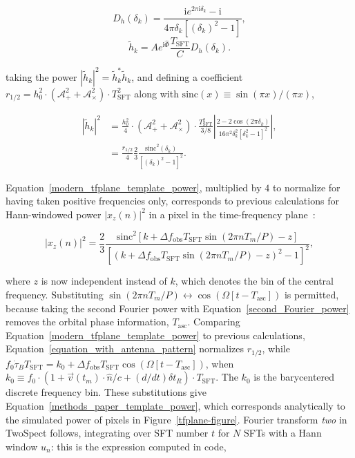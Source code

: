 \documentclass[12pt]{iopart}
\begin{document}
\begin{equation}
D_h (\delta_k) = \frac{\mathrm{i} e^{2\pi \mathrm{i} \delta_k} - \mathrm{i}}{4\pi \delta_k \left[(\delta_k)^2 - 1 \right]},
\end{equation} 
\begin{equation}
\tilde{h}_k = A e^{\mathrm{i} \hat{\Phi}} \frac{T_\mathrm{SFT}}{C} D_h \left( \delta_k \right).
\end{equation}

\noindent taking the power $|\tilde{h}_k|^2 = \tilde{h}_k^*\tilde{h}_k$, and defining a coefficient $r_{1/2}= h_0^2 \cdot (\mathcal{A}_+^2 + \mathcal{A}_\times^2)\cdot T_\mathrm{SFT}^2$ along with $\mathrm{sinc}(x) \equiv \sin (\pi x)/ (\pi x)$,

\begin{eqnarray}
|\tilde{h}_k|^2 &= \frac{h_0^2}{4} \cdot (\mathcal{A}_+^2 + \mathcal{A}_\times^2)\cdot\frac{T_\mathrm{SFT}^2}{3/8} \left|\frac{2 - 2 \cos(2\pi \delta_k)}{16 \pi^2 \delta_k^2 [\delta_k^2 -1]^2} \right|,\nonumber \\
 &= \frac{r_{1/2}}{4} \frac{2}{3} \frac{\mathrm{sinc}^2\left(\delta_k\right)}{[\left(\delta_k \right)^2-1]^2}.
\label{modern_tfplane_template_power}
\end{eqnarray} 

Equation~\ref{modern_tfplane_template_power}, multiplied by $4$ to normalize for having taken positive frequencies only, corresponds to previous calculations for Hann-windowed power $|x_z(n)|^2$ in a pixel in the time-frequency plane~\cite{GoetzTwoSpectMethods2011}:

\begin{equation}
|x_z (n)|^2 = \frac{2}{3} \frac{\mathrm{sinc}^2\left[k + \Delta f_\mathrm{obs} T_\mathrm{SFT} \sin (2\pi n T_m/P) - z \right]}{\left[ (k + \Delta f_\mathrm{obs} T_\mathrm{SFT} \sin (2\pi n T_m / P) - z)^2 - 1 \right]^2},
\label{methods_paper_template_power}
\end{equation}

\noindent where $z$ is now independent instead of $k$, which denotes the bin of the central frequency. 
Substituting $\sin(2\pi nT_m/P) \leftrightarrow \cos(\Omega [t-T_\mathrm{asc}])$ is permitted, because taking the second Fourier power with Equation~\ref{second_Fourier_power} removes the orbital phase information, $T_\mathrm{asc}$.
Comparing Equation~\ref{modern_tfplane_template_power} to previous calculations, Equation~\ref{equation_with_antenna_pattern} normalizes $r_{1/2}$, while $f_0 \dot{\tau}_B T_\mathrm{SFT}= k_0 + \Delta f_\mathrm{obs} T_\mathrm{SFT} \cos(\Omega [t-T_\mathrm{asc}])$, when $k_0\equiv f_0 \cdot (1+\vec{v}(t_m)\cdot\hat{n}/c + (d/dt)\delta t_R)\cdot T_\mathrm{SFT}$.
The $k_0$ is the barycentered discrete frequency bin.
These substitutions give Equation~\ref{methods_paper_template_power}, which corresponds analytically to the simulated power of pixels in Figure~\ref{tfplane-figure}.
Fourier transform \textit{two} in TwoSpect follows, integrating over SFT number $t$ for $N$ SFTs with a Hann window $u_n$:
this is the expression computed in code,
\end{document}
